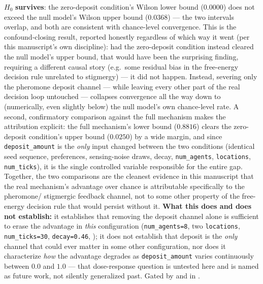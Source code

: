 \documentclass[
  english,
]{article}
\theoremstyle{definition}
\begin{document}
\(H_0\) \textbf{survives}: the zero-deposit condition's Wilson lower
bound (\(0.0000\)) does not exceed the null model's Wilson upper bound
(\(0.0368\)) --- the two intervals overlap, and both are consistent with
chance-level convergence. This is the confound-closing result, reported
honestly regardless of which way it went (per this manuscript's own
discipline): had the zero-deposit condition instead cleared the null
model's upper bound, that would have been the surprising finding,
requiring a different causal story (e.g.~some residual bias in the
free-energy decision rule unrelated to stigmergy) --- it did not happen.
Instead, severing only the pheromone deposit channel --- while leaving
every other part of the real decision loop untouched --- collapses
convergence all the way down to (numerically, even slightly below) the
null model's own chance-level rate. A second, confirmatory comparison
against the full mechanism makes the attribution explicit: the full
mechanism's lower bound (\(0.8816\)) clears the zero-deposit condition's
upper bound (\(0.0250\)) by a wide margin, and since
\texttt{deposit\_amount} is the \emph{only} input changed between the
two conditions (identical seed sequence, preferences, sensing-noise
draws, decay, \texttt{num\_agents}, \texttt{locations},
\texttt{num\_ticks}), it is the single controlled variable responsible
for the entire gap. Together, the two comparisons are the cleanest
evidence in this manuscript that the real mechanism's advantage over
chance is attributable specifically to the pheromone/ stigmergic
feedback channel, not to some other property of the free-energy decision
rule that would persist without it. \textbf{What this does and does not
establish:} it establishes that removing the deposit channel alone is
sufficient to erase the advantage in \emph{this} configuration
(\texttt{num\_agents=8}, two \texttt{locations}, \texttt{num\_ticks=30},
\texttt{decay=0.46}, ); it does not
establish that deposit is the \emph{only} channel that could ever matter
in some other configuration, nor does it characterize \emph{how} the
advantage degrades as \texttt{deposit\_amount} varies continuously
between \(0.0\) and \(1.0\) --- that dose-response question is untested
here and is named as future work, not silently generalized past. Gated
by
and
in .
\end{document}
